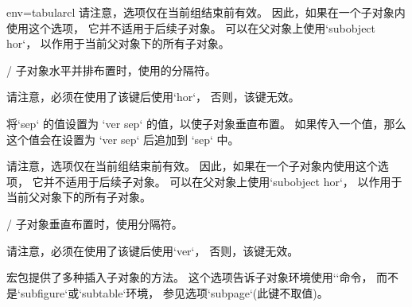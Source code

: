 \begin{tableobject}{env=tabular}{cl}
  请注意，选项仅在当前组结束前有效。
  因此，如果在一个子对象内使用这个选项，
  它并不适用于后续子对象。
  可以在父对象上使用`subobject hor`，
  以作用于当前父对象下的所有子对象。

 /
  子对象水平并排布置时，使用的分隔符。

  请注意，必须在使用了该键后使用`hor`，
  否则，该键无效。

  将`sep` 的值设置为 `ver sep` 的值，以使子对象垂直布置。
  如果传入一个值，那么这个值会在设置为 `ver sep` 后追加到 `sep` 中。

  请注意，选项仅在当前组结束前有效。
  因此，如果在一个子对象内使用这个选项，
  它并不适用于后续子对象。
  可以在父对象上使用`subobject hor`，
  以作用于当前父对象下的所有子对象。

 /
  子对象垂直布置时，使用分隔符。

  请注意，必须在使用了该键后使用`ver`，
  否则，该键无效。

\bigpar

  宏包提供了多种插入子对象的方法。
  这个选项告诉子对象环境使用`\subcaptionbox`命令，
  而不是`subfigure`或`subtable`环境，
  参见选项`subpage`(此键不取值)。


\end{tableobject}
